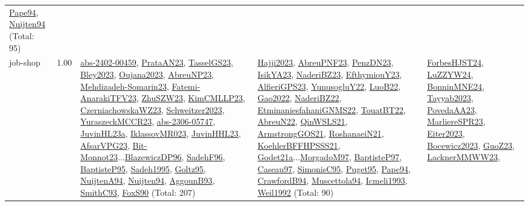 {\begin{longtable}{p{3cm}r>{\raggedright\arraybackslash}p{6cm}>{\raggedright\arraybackslash}p{6cm}>{\raggedright\arraybackslash}p{8cm}}
\hyperref[detail:Pape94]{Pape94}, \hyperref[detail:Nuijten94]{Nuijten94} (Total: 95)\\
\index{job-shop}\index{Concepts!job-shop}job-shop &  1.00 & \hyperref[detail:abs-2402-00459]{abs-2402-00459}, \hyperref[detail:PrataAN23]{PrataAN23}, \hyperref[detail:TasselGS23]{TasselGS23}, \hyperref[detail:Bley2023]{Bley2023}, \hyperref[detail:Oujana2023]{Oujana2023}, \hyperref[detail:AbreuNP23]{AbreuNP23}, \hyperref[detail:Mehdizadeh-Somarin23]{Mehdizadeh-Somarin23}, \hyperref[detail:Fatemi-AnarakiTFV23]{Fatemi-AnarakiTFV23}, \hyperref[detail:ZhuSZW23]{ZhuSZW23}, \hyperref[detail:KimCMLLP23]{KimCMLLP23}, \hyperref[detail:CzerniachowskaWZ23]{CzerniachowskaWZ23}, \hyperref[detail:Schweitzer2023]{Schweitzer2023}, \hyperref[detail:YuraszeckMCCR23]{YuraszeckMCCR23}, \hyperref[detail:abs-2306-05747]{abs-2306-05747}, \hyperref[detail:JuvinHL23a]{JuvinHL23a}, \hyperref[detail:IklassovMR023]{IklassovMR023}, \hyperref[detail:JuvinHHL23]{JuvinHHL23}, \hyperref[detail:AfsarVPG23]{AfsarVPG23}, \hyperref[detail:Bit-Monnot23]{Bit-Monnot23}...\hyperref[detail:BlazewiczDP96]{BlazewiczDP96}, \hyperref[detail:SadehF96]{SadehF96}, \hyperref[detail:BaptisteP95]{BaptisteP95}, \hyperref[detail:Sadeh1995]{Sadeh1995}, \hyperref[detail:Goltz95]{Goltz95}, \hyperref[detail:NuijtenA94]{NuijtenA94}, \hyperref[detail:Nuijten94]{Nuijten94}, \hyperref[detail:AggounB93]{AggounB93}, \hyperref[detail:SmithC93]{SmithC93}, \hyperref[detail:FoxS90]{FoxS90} (Total: 207) & \hyperref[detail:Hajji2023]{Hajji2023}, \hyperref[detail:AbreuPNF23]{AbreuPNF23}, \hyperref[detail:PenzDN23]{PenzDN23}, \hyperref[detail:IsikYA23]{IsikYA23}, \hyperref[detail:NaderiBZ23]{NaderiBZ23}, \hyperref[detail:EfthymiouY23]{EfthymiouY23}, \hyperref[detail:AlfieriGPS23]{AlfieriGPS23}, \hyperref[detail:YunusogluY22]{YunusogluY22}, \hyperref[detail:LuoB22]{LuoB22}, \hyperref[detail:Gao2022]{Gao2022}, \hyperref[detail:NaderiBZ22]{NaderiBZ22}, \hyperref[detail:EtminaniesfahaniGNMS22]{EtminaniesfahaniGNMS22}, \hyperref[detail:TouatBT22]{TouatBT22}, \hyperref[detail:AbreuN22]{AbreuN22}, \hyperref[detail:QinWSLS21]{QinWSLS21}, \hyperref[detail:ArmstrongGOS21]{ArmstrongGOS21}, \hyperref[detail:RoshanaeiN21]{RoshanaeiN21}, \hyperref[detail:KoehlerBFFHPSSS21]{KoehlerBFFHPSSS21}, \hyperref[detail:Godet21a]{Godet21a}...\hyperref[detail:MorgadoM97]{MorgadoM97}, \hyperref[detail:BaptisteP97]{BaptisteP97}, \hyperref[detail:Caseau97]{Caseau97}, \hyperref[detail:SimonisC95]{SimonisC95}, \hyperref[detail:Puget95]{Puget95}, \hyperref[detail:Pape94]{Pape94}, \hyperref[detail:CrawfordB94]{CrawfordB94}, \hyperref[detail:Muscettola94]{Muscettola94}, \hyperref[detail:Icmeli1993]{Icmeli1993}, \hyperref[detail:Weil1992]{Weil1992} (Total: 90) & \hyperref[detail:ForbesHJST24]{ForbesHJST24}, \hyperref[detail:LuZZYW24]{LuZZYW24}, \hyperref[detail:BonninMNE24]{BonninMNE24}, \hyperref[detail:Tayyab2023]{Tayyab2023}, \hyperref[detail:PovedaAA23]{PovedaAA23}, \hyperref[detail:MarliereSPR23]{MarliereSPR23}, \hyperref[detail:Eiter2023]{Eiter2023}, \hyperref[detail:Bocewicz2023]{Bocewicz2023}, \hyperref[detail:GuoZ23]{GuoZ23}, \hyperref[detail:LacknerMMWW23]{LacknerMMWW23}, 
\end{longtable}}
